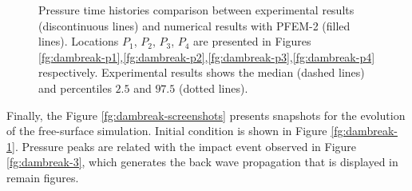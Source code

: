 \documentclass[a4paper,conference]{IEEEtran}
\begin{document}
\begin{figure}
{    }
   \caption{Pressure time histories comparison between experimental results\cite{Lobovsky13} (discontinuous lines) and numerical results with PFEM-2 (filled lines). Locations $P_1$, $P_2$, $P_3$, $P_4$ are presented in Figures \ref{fg:dambreak-p1},\ref{fg:dambreak-p2},\ref{fg:dambreak-p3},\ref{fg:dambreak-p4} respectively. Experimental results shows the median (dashed lines) and percentiles $2.5$ and $97.5$ (dotted lines).}
   \label{fg:dambreak-p}                %
\end{figure}

Finally, the Figure \ref{fg:dambreak-screenshots} presents snapshots for the evolution of the free-surface simulation. Initial condition is shown in Figure \ref{fg:dambreak-1}. Pressure peaks are related with the impact event observed in Figure \ref{fg:dambreak-3}, which generates the back wave propagation that is displayed in remain figures.
\end{document}
